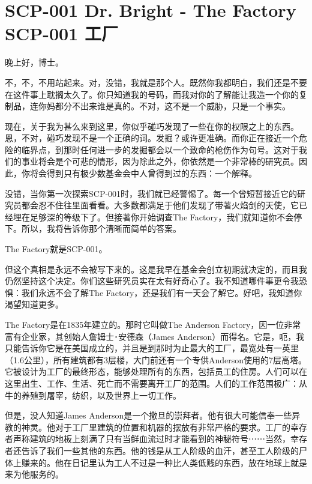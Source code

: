 \chapter[SCP-001 工厂]{
	SCP-001 Dr. Bright - The Factory \\ 
	SCP-001 工厂
}

\label{chap:SCP-001.the.factory}


晚上好，博士。

不，不，不用站起来。对，没错，我就是那个人。既然你我都明白，我们还是不要在这件事上耽搁太久了。你只知道我的号码，而我对你的了解能让我造一个你的复制品，连你妈都分不出来谁是真的。不对，这不是一个威胁，只是一个事实。

现在，关于我为甚么来到这里，你似乎碰巧发现了一些在你的权限之上的东西。恩，不对，碰巧发现不是一个正确的词。发掘？或许更准确。而你正在接近一个危险的临界点，到那时任何进一步的发掘都会以一个致命的枪伤作为句号。这对于我们的事业将会是个可悲的情形，因为除此之外，你依然是一个非常棒的研究员。因此，你将会得到只有极少数基金会中人曾得到过的东西：一个解释。

没错，当你第一次探索SCP-001时，我们就已经警惕了。每一个曾短暂接近它的研究员都会忍不住往里面看看。大多数都满足于他们发现了带著火焰剑的天使，它已经埋在足够深的等级下了。但接著你开始调查The Factory，我们就知道你不会停下。所以，我将告诉你那个清晰而简单的答案。

The Factory就是SCP-001。

但这个真相是永远不会被写下来的。这是我早在基金会创立初期就决定的，而且我仍然坚持这个决定。你们这些研究员实在太有好奇心了。我不知道哪件事更令我恐惧：我们永远不会了解The Factory，还是我们有一天会了解它。好吧，我知道你渴望知道更多。

The Factory是在1835年建立的。那时它叫做The Anderson Factory，因一位非常富有企业家，其创始人詹姆士･安德森（James Anderson）而得名。它是，呃，我只能告诉你它是在美国成立的，并且是到那时为止最大的工厂，最宽处有一英里（1.6公里），所有建筑都有3层楼，大门前还有一个专供Anderson使用的7层高塔。它被设计为工厂的最终形态，能够处理所有的东西，包括员工的住房。人们可以在这里出生、工作、生活、死亡而不需要离开工厂的范围。人们的工作范围极广：从牛的养殖到屠宰，纺织，以及世界上一切工作。

但是，没人知道James Anderson是一个撒旦的崇拜者。他有很大可能信奉一些异教的神灵。他对于工厂里建筑的位置和机器的摆放有非常严格的要求。工厂的幸存者声称建筑的地板上刻满了只有当鲜血流过时才能看到的神秘符号⋯⋯当然，幸存者还告诉了我们一些其他的东西。他的钱是从工人阶级的血汗，甚至工人阶级的尸体上赚来的。他在日记里认为工人不过是一种比人类低贱的东西，放在地球上就是来为他服务的。

